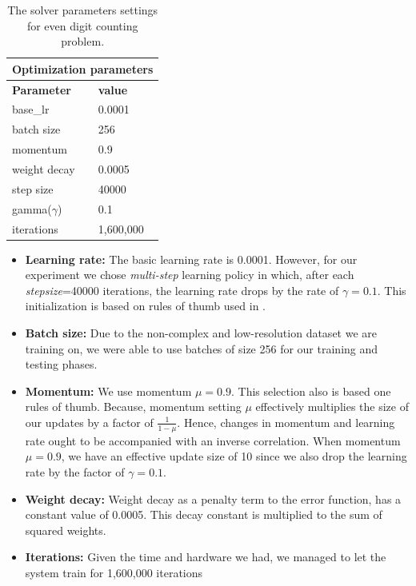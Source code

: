 \begin{table}[H]
	\centering
			\caption{The solver parameters settings for even digit counting problem.}
	\begin{tabular}{ |p{2cm}|p{2cm}| }
	\hline 
	\multicolumn{2}{|c|}{\textbf{Optimization parameters}} \\
	\hline
	\hline
	\textbf{Parameter} & \textbf{value}\\
	\hline
	base\_lr & 0.0001\\
	\hline
	batch size & 256\\
	\hline
	momentum & 0.9  \\
	\hline
	weight decay & 0.0005\\
	\hline
	step size   & 40000 \\
	\hline
	gamma($\gamma$) & 0.1\\
	\hline
	iterations & 1,600,000\\
	\hline
	\end{tabular}

		\label{tab:digitsolver}
\end{table}


\begin{itemize}
\label{solv:param}
\item \textbf{Learning rate:} The basic learning rate is 0.0001. However, for our experiment we chose \textit{multi-step} learning policy in which, after each \textit{stepsize}=40000 iterations, the learning rate drops by the rate of $\gamma = 0.1$. This initialization is based on rules of thumb used in \cite{krizhevsky2012imagenet}.
\item \textbf{Batch size:} Due to the non-complex and low-resolution dataset we are training on, we were able to use batches of size 256 for our training and testing phases.
\item \textbf{Momentum:} We use momentum $\mu = 0.9$. This selection also is based one rules of thumb. Because, momentum setting $\mu$ effectively multiplies the size of our updates by a factor of $\frac{1}{1-\mu}$. Hence, changes in momentum and learning rate ought to be accompanied with an inverse correlation. When momentum $\mu = 0.9$, we have an effective update size of 10 since we also drop the learning rate by the factor of $\gamma= 0.1$.
\item \textbf{Weight decay:} Weight decay as a penalty term to the error function, has a constant value of 0.0005. This decay constant is multiplied to the sum of squared weights.
\item \textbf{Iterations:} Given the time and hardware we had, we managed to let the system train for 1,600,000 iterations
\end{itemize}

